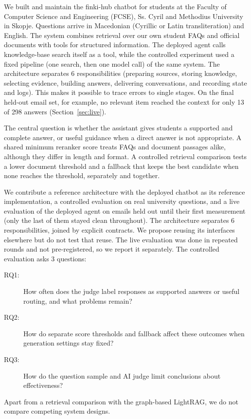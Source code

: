 \documentclass[a4paper,10pt,twocolumn]{article}
\begin{document}
We built and maintain the finki-hub chatbot for students at the Faculty of Computer Science and Engineering (FCSE), Ss. Cyril and Methodius University in Skopje. Questions arrive in Macedonian (Cyrillic or Latin transliteration) and English. The system combines retrieval over our own student FAQs and official documents with tools for structured information. The deployed agent calls knowledge-base search itself as a tool, while the controlled experiment used a fixed pipeline (one search, then one model call) of the same system. The architecture separates 6 responsibilities (preparing sources, storing knowledge, selecting evidence, building answers, delivering conversations, and recording state and logs). This makes it possible to trace errors to single stages. On the final held-out email set, for example, no relevant item reached the context for only 13 of 298 answers (Section~\ref{sec:live}).

The central question is whether the assistant gives students a supported and complete answer, or useful guidance when a direct answer is not appropriate. A shared minimum reranker score treats FAQs and document passages alike, although they differ in length and format. A controlled retrieval comparison tests a lower document threshold and a fallback that keeps the best candidate when none reaches the threshold, separately and together.

We contribute a reference architecture with the deployed chatbot as its reference implementation, a controlled evaluation on real university questions, and a live evaluation of the deployed agent on emails held out until their first measurement (only the last of them stayed clean throughout). The architecture separates 6 responsibilities, joined by explicit contracts. We propose reusing its interfaces elsewhere but do not test that reuse. The live evaluation was done in repeated rounds and not pre-registered, so we report it separately. The controlled evaluation asks 3 questions:
\begin{description}
\item[RQ1:] How often does the judge label responses as supported answers or useful routing, and what problems remain?
\item[RQ2:] How do separate score thresholds and fallback affect these outcomes when generation settings stay fixed?
\item[RQ3:] How do the question sample and AI judge limit conclusions about effectiveness?
\end{description}
Apart from a retrieval comparison with the graph-based LightRAG, we do not compare competing system designs.
\end{document}
